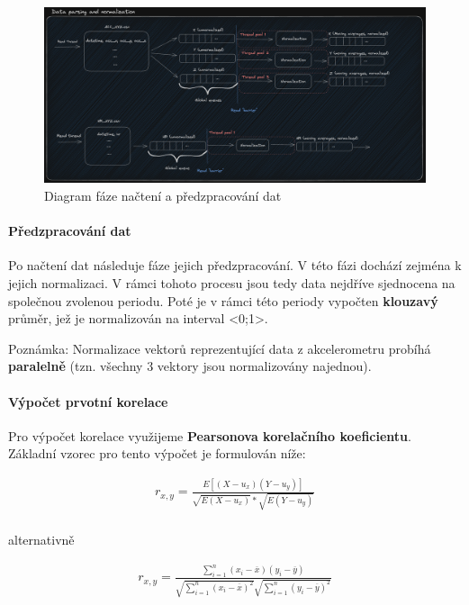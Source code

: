 \documentclass[12pt, a4paper]{article}
\begin{document}
\begin{figure}
  \includegraphics[width=\linewidth]{assets/ppr_diagram_p2.png}
  \caption{Diagram fáze načtení a předzpracování dat}
\end{figure}

\newpage
\paragraph{Předzpracování dat} Po načtení dat následuje fáze jejich předzpracování. 
V této fázi dochází zejména k jejich normalizaci. 
V rámci tohoto procesu jsou tedy data nejdříve sjednocena na společnou zvolenou periodu. 
Poté je v rámci této periody vypočten \textbf{klouzavý} průměr, jež je normalizován na interval <0;1>.

Poznámka: Normalizace vektorů reprezentující data z akcelerometru probíhá \textbf{paralelně} (tzn. všechny 3 vektory jsou normalizovány najednou). 

\paragraph{Výpočet prvotní korelace} 
Pro výpočet korelace využijeme \textbf{Pearsonova korelačního koeficientu}.
Základní vzorec pro tento výpočet je formulován níže: 

\begin{center}
  \begin{equation}
    \begin{aligned}
      r_{x, y} = \frac{E{[(X - u_x)(Y - u_y)]}}{\sqrt{E(X - u_x)} * \sqrt{E(Y - u_y)}} \\
    \end{aligned}
  \end{equation}

  alternativně 

  \label{eq-pearson-two-pass}
  \begin{equation}
    \begin{aligned}
      r_{x, y} = \frac{\sum_{i=1}^{n}{(x_i - \overline{x})(y_i - \overline{y})}}{\sqrt{\sum_{i=1}^{n}{(x_i - \overline{x})^2}} \sqrt{\sum_{i=1}^{n}{(y_i - \overline{y})^2}}}
    \end{aligned}
  \end{equation}
\end{center}
\end{document}
